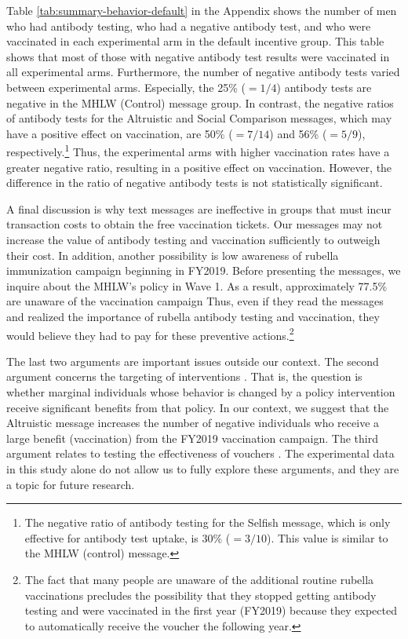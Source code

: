 \documentclass[
]{article}
\begin{document}
Table \ref{tab:summary-behavior-default} in the Appendix shows the number of men who had antibody testing, who had a negative antibody test, and who were vaccinated in each experimental arm in the default incentive group. This table shows that most of those with negative antibody test results were vaccinated in all experimental arms. Furthermore, the number of negative antibody tests varied between experimental arms. Especially, the 25\% (\(=1/4\)) antibody tests are negative in the MHLW (Control) message group. In contrast, the negative ratios of antibody tests for the Altruistic and Social Comparison messages, which may have a positive effect on vaccination, are 50\% (\(=7/14\)) and 56\% (\(=5/9\)), respectively.\footnote{The negative ratio of antibody testing for the Selfish message, which is only effective for antibody test uptake, is 30\% (\(=3/10\)). This value is similar to the MHLW (control) message.} Thus, the experimental arms with higher vaccination rates have a greater negative ratio, resulting in a positive effect on vaccination. However, the difference in the ratio of negative antibody tests is not statistically significant.

A final discussion is why text messages are ineffective in groups that must incur transaction costs to obtain the free vaccination tickets. Our messages may not increase the value of antibody testing and vaccination sufficiently to outweigh their cost. In addition, another possibility is low awareness of rubella immunization campaign beginning in FY2019. Before presenting the messages, we inquire about the MHLW's policy in Wave 1. As a result, approximately 77.5\% are unaware of the vaccination campaign Thus, even if they read the messages and realized the importance of rubella antibody testing and vaccination, they would believe they had to pay for these preventive actions.\footnote{The fact that many people are unaware of the additional routine rubella vaccinations precludes the possibility that they stopped getting antibody testing and were vaccinated in the first year (FY2019) because they expected to automatically receive the voucher the following year.}

The last two arguments are important issues outside our context. The second argument concerns the targeting of interventions \citep[e.g.,][]{Finkelstein2019}. That is, the question is whether marginal individuals whose behavior is changed by a policy intervention receive significant benefits from that policy. In our context, we suggest that the Altruistic message increases the number of negative individuals who receive a large benefit (vaccination) from the FY2019 vaccination campaign. The third argument relates to testing the effectiveness of vouchers \citep[e.g.,][]{Kacker2022}. The experimental data in this study alone do not allow us to fully explore these arguments, and they are a topic for future research.
\end{document}
